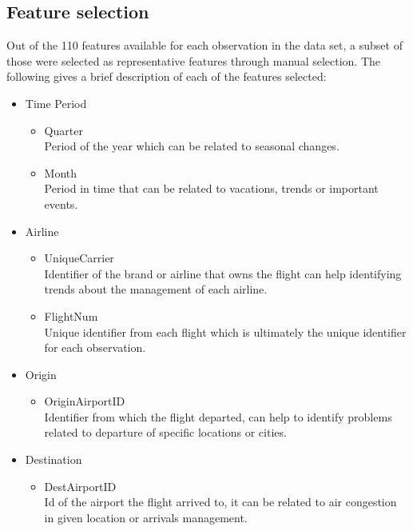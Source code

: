 \documentclass{article}
\begin{document}
    \subsection{Feature selection}
    Out of the 110 features available for each observation in the data set, a subset
    of those were selected as representative features through manual selection. The following
    gives a brief description of each of the features selected:
    \begin{itemize}
        \item Time Period
        \begin{itemize}
            \item Quarter\\
                Period of the year which can be related to seasonal changes.
            \item Month\\
                Period in time that can be related to vacations, trends or important
                 events.
        \end{itemize}
        \item Airline
        \begin{itemize}
            \item UniqueCarrier\\
                Identifier of the brand or airline that owns the flight can help
                identifying trends about the management of each airline.
            \item FlightNum\\
                Unique identifier from each flight which is ultimately the unique
                identifier for each observation.
        \end{itemize}
        \item Origin
        \begin{itemize}
            \item OriginAirportID\\
                Identifier from which the flight departed, can help to identify
                problems related to departure of specific locations or cities.
        \end{itemize}
        \item Destination
        \begin{itemize}
            \item DestAirportID\\
                Id of the airport the flight arrived to, it can be related
                to air congestion in given location or arrivals management.

\end{itemize}
\end{itemize}
\end{document}
